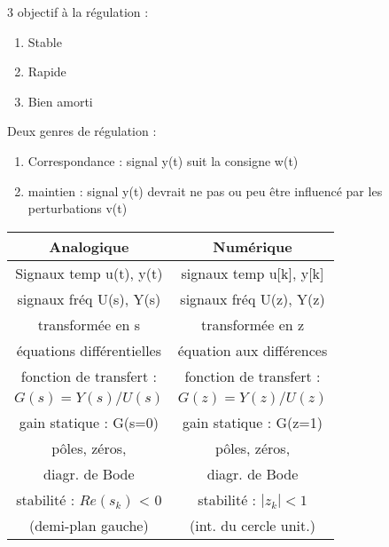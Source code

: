 
3 objectif à la régulation : 
\begin{enumerate}
    \item Stable
    \item Rapide 
    \item Bien amorti
\end{enumerate}

Deux genres de régulation :
\begin{enumerate}
    \item Correspondance : signal y(t) suit la consigne w(t)
    \item maintien : signal y(t) devrait ne pas ou peu être influencé par les perturbations v(t)
\end{enumerate}
\hformbar


{\footnotesize 
\begin{center}
    \begin{tabular}{c|c}
        Analogique & Numérique \\ \hline
        Signaux temp u(t), y(t) & signaux temp u[k], y[k]\\ \hline
        signaux fréq U(s), Y(s) & signaux fréq U(z), Y(z)\\ \hline
        transformée en s&  transformée en z\\ \hline
        équations différentielles&  équation aux différences\\ \hline
        fonction de transfert :&fonction de transfert :\\ 
        $G(s) = Y(s) / U(s)$& $G(z) = Y(z) / U(z)$\\ \hline
        gain statique : G(s=0) &gain statique : G(z=1)\\ \hline
        pôles, zéros, & pôles, zéros, \\ \hline
        diagr. de Bode&diagr. de Bode\\ \hline
        stabilité : $Re(s_k)$ < 0&stabilité : $|z_k| < 1$\\ 
        (demi-plan gauche)&(int. du cercle unit.)\\ \hline
    \end{tabular}
\end{center}
}